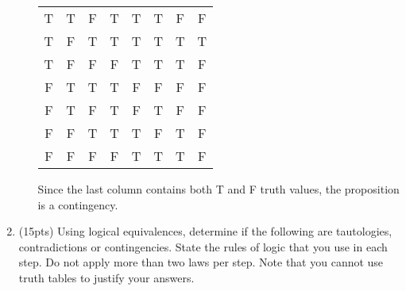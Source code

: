 \documentclass{article}
\begin{document}
\begin{enumerate}
\begin{enumerate}
{\begin{center}
\begin{tabular}{ccc|ccccc}
T & T & F & T & T & T & F & F\\
T & F & T & T & T & T & T & T\\
T & F & F & F & T & T & T & F\\ 
F & T & T & T & F & F & F & F\\ 
F & T & F & T & F & T & F & F\\ 
F & F & T & T & T & F & T & F\\ 
F & F & F & F & T & T & T & F\\ 
\end{tabular}
\end{center}
Since the last column contains both T and F truth values, the proposition is a contingency.}
\end{enumerate}

\newpage

\item(15pts) Using logical equivalences, determine if the following are tautologies, contradictions or contingencies. State the rules of logic that you use in each step. Do not apply more than two laws per step. Note that you cannot use truth tables to justify your answers.


\end{enumerate}
\end{document}
